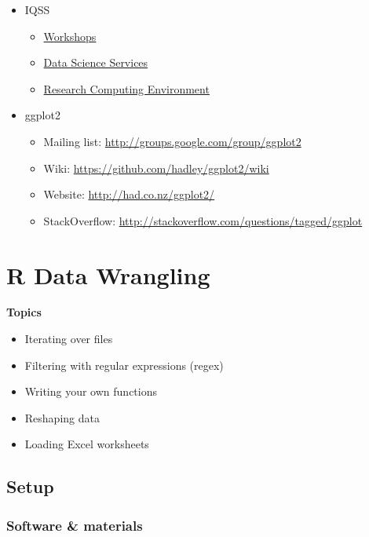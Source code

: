 \documentclass[]{book}
\providecommand{\tightlist}{%
  \setlength{\itemsep}{0pt}\setlength{\parskip}{0pt}}
\begin{document}
\begin{itemize}
\tightlist
\item
  IQSS

  \begin{itemize}
  \tightlist
  \item
    \href{https://dss.iq.harvard.edu/workshop-materials}{Workshops}
  \item
    \href{https://dss.iq.harvard.edu/}{Data Science Services}
  \item
    \href{https://iqss.github.io/dss-rce/}{Research Computing
    Environment}
  \end{itemize}
\item
  ggplot2

  \begin{itemize}
  \tightlist
  \item
    Mailing list: \url{http://groups.google.com/group/ggplot2}
  \item
    Wiki: \url{https://github.com/hadley/ggplot2/wiki}
  \item
    Website: \url{http://had.co.nz/ggplot2/}
  \item
    StackOverflow:
    \url{http://stackoverflow.com/questions/tagged/ggplot}
  \end{itemize}
\end{itemize}

\chapter{R Data Wrangling}\label{r-data-wrangling}

\textbf{Topics}

\begin{itemize}
\tightlist
\item
  Iterating over files
\item
  Filtering with regular expressions (regex)
\item
  Writing your own functions
\item
  Reshaping data
\item
  Loading Excel worksheets
\end{itemize}

\section{Setup}\label{setup-3}

\subsection{Software \& materials}\label{software-materials-3}
\end{document}
